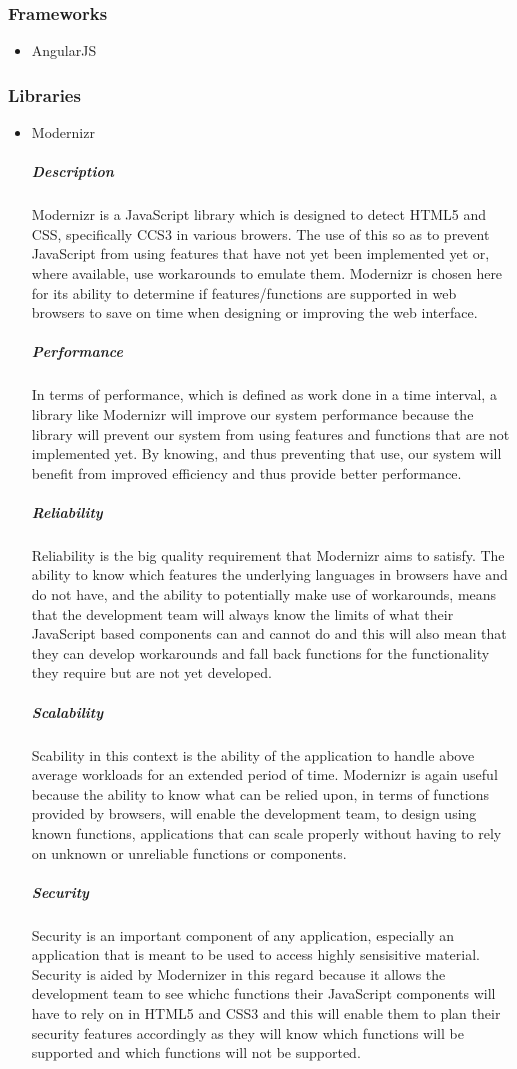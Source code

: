 \documentclass[a4paper,10pt]{article}
\begin{document}
\subsubsection{Frameworks}
	\begin{itemize}
		\item AngularJS
	\end{itemize}

\subsubsection{Libraries}
	\begin{itemize}
		\item Modernizr
			\subparagraph{Description}
			Modernizr is a JavaScript library which is designed to detect HTML5 and CSS, specifically CCS3 in various browers. The use of this so as to prevent JavaScript from using features that have not yet been implemented yet or, where available, use workarounds to emulate them.
			Modernizr is chosen here for its ability to determine if features/functions are supported in web browsers to save on time when designing or improving the web interface.
			\subparagraph{Performance}
			In terms of performance, which is defined as work done in a time interval, a library like Modernizr will improve our system performance because the library will prevent our system from using features and functions that are not implemented yet. By knowing, and thus preventing that use, our system will benefit from improved efficiency and thus provide better performance.
			\subparagraph{Reliability}
			Reliability is the big quality requirement that Modernizr aims to satisfy. The ability to know which features the underlying languages in browsers have and do not have, and the ability to potentially make use of workarounds, means that the development team will always know the limits of what their JavaScript based components can and cannot do and this will also mean that they can develop workarounds and fall back functions for the functionality they require but are not yet developed.
			\subparagraph{Scalability}
			Scability in this context is the ability of the application to handle above average workloads for an extended period of time. Modernizr is again useful because the ability to know what can be relied upon, in terms of functions provided by browsers, will enable the development team, to design using known functions, applications that can scale properly without having to rely on unknown or unreliable functions or components.
			\subparagraph{Security}
			Security is an important component of any application, especially an application that is meant to be used to access highly sensisitive material. Security is aided by Modernizer in this regard because it allows the development team to see whichc functions their JavaScript components will have to rely on in HTML5 and CSS3 and this will enable them to plan their security features accordingly as they will know which functions will be supported and which functions will not be supported.

\end{itemize}
\end{document}
